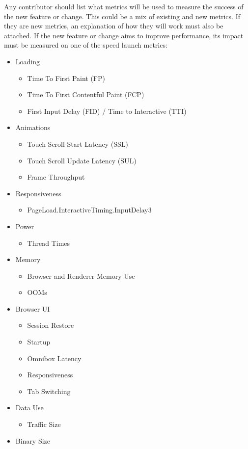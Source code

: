 Any contributor should list what metrics will be used to measure the success of the new feature or change. This could be a mix of existing and new metrics. If they are new metrics, an explanation of how they will work must also be attached. If the new feature or change aims to improve performance, its impact must be measured on one of the speed launch metrics:
\begin{itemize}
    \item Loading
        \begin{itemize}
            \item Time To First Paint (FP)
            \item Time To First Contentful Paint (FCP)
            \item First Input Delay (FID) / Time to Interactive (TTI)
        \end{itemize}
    \item Animations
        \begin{itemize}
            \item Touch Scroll Start Latency (SSL)
            \item Touch Scroll Update Latency (SUL)
            \item Frame Throughput
        \end{itemize}
    \item Responsiveness
        \begin{itemize}
            \item PageLoad.InteractiveTiming.InputDelay3
        \end{itemize}
    \item Power
        \begin{itemize}
            \item Thread Times
        \end{itemize}
    \item Memory
        \begin{itemize}
            \item Browser and Renderer Memory Use
            \item OOMs
        \end{itemize}
    \item Browser UI
        \begin{itemize}
            \item Session Restore
            \item Startup
            \item Omnibox Latency
            \item Responsiveness
            \item Tab Switching
        \end{itemize}
    \item Data Use
        \begin{itemize}
            \item Traffic Size
        \end{itemize}
    \item Binary Size
\end{itemize}


